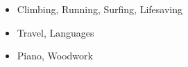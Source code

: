 %
%
%

\twocolumnsection
{
\begin{skills}
\end{skills}}
{
\begin{itemize}
\vspace{1em}
	\item Climbing, Running, Surfing, Lifesaving
	\item Travel, Languages                    
   	\item Piano, Woodwork
\end{itemize}
}
